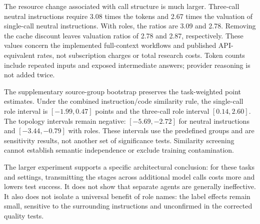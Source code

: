 The resource change associated with call structure is much larger. Three-call neutral instructions require 3.08 times the tokens and 2.67 times the valuation of single-call neutral instructions. With roles, the ratios are 3.09 and 2.78. Removing the cache discount leaves valuation ratios of 2.78 and 2.87, respectively. These values concern the implemented full-context workflows and published API-equivalent rates, not subscription charges or total research costs. Token counts include repeated inputs and exposed intermediate answers; provider reasoning is not added twice.

The supplementary source-group bootstrap preserves the task-weighted point estimates. Under the combined instruction/code similarity rule, the single-call role interval is $[-1.99,0.47]$ points and the three-call role interval $[0.14,2.60]$. The topology intervals remain negative: $[-5.69,-2.72]$ for neutral instructions and $[-3.44,-0.79]$ with roles. These intervals use the predefined groups and are sensitivity results, not another set of significance tests. Similarity screening cannot establish semantic independence or exclude training contamination.

The larger experiment supports a specific architectural conclusion: for these tasks and settings, transmitting the stages across additional model calls costs more and lowers test success. It does not show that separate agents are generally ineffective. It also does not isolate a universal benefit of role names: the label effects remain small, sensitive to the surrounding instructions and unconfirmed in the corrected quality tests.
